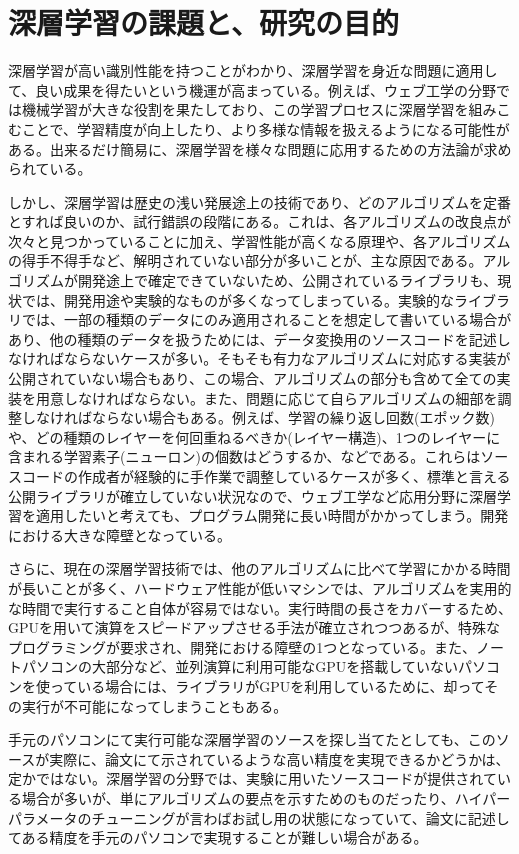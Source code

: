 \section{深層学習の課題と、研究の目的}
深層学習が高い識別性能を持つことがわかり、深層学習を身近な問題に適用して、良い成果を得たいという機運が高まっている。例えば、ウェブ工学の分野では機械学習が大きな役割を果たしており、この学習プロセスに深層学習を組みこむことで、学習精度が向上したり、より多様な情報を扱えるようになる可能性がある。出来るだけ簡易に、深層学習を様々な問題に応用するための方法論が求められている。\par
しかし、深層学習は歴史の浅い発展途上の技術であり、どのアルゴリズムを定番とすれば良いのか、試行錯誤の段階にある。これは、各アルゴリズムの改良点が次々と見つかっていることに加え、学習性能が高くなる原理や、各アルゴリズムの得手不得手など、解明されていない部分が多いことが、主な原因である。アルゴリズムが開発途上で確定できていないため、公開されているライブラリも、現状では、開発用途や実験的なものが多くなってしまっている。実験的なライブラリでは、一部の種類のデータにのみ適用されることを想定して書いている場合があり、他の種類のデータを扱うためには、データ変換用のソースコードを記述しなければならないケースが多い。そもそも有力なアルゴリズムに対応する実装が公開されていない場合もあり、この場合、アルゴリズムの部分も含めて全ての実装を用意しなければならない。また、問題に応じて自らアルゴリズムの細部を調整しなければならない場合もある。例えば、学習の繰り返し回数(エポック数)や、どの種類のレイヤーを何回重ねるべきか(レイヤー構造)、1つのレイヤーに含まれる学習素子(ニューロン)の個数はどうするか、などである。これらはソースコードの作成者が経験的に手作業で調整しているケースが多く、標準と言える公開ライブラリが確立していない状況なので、ウェブ工学など応用分野に深層学習を適用したいと考えても、プログラム開発に長い時間がかかってしまう。開発における大きな障壁となっている。\par
さらに、現在の深層学習技術では、他のアルゴリズムに比べて学習にかかる時間が長いことが多く、ハードウェア性能が低いマシンでは、アルゴリズムを実用的な時間で実行すること自体が容易ではない。実行時間の長さをカバーするため、GPUを用いて演算をスピードアップさせる手法が確立されつつあるが、特殊なプログラミングが要求され、開発における障壁の1つとなっている。また、ノートパソコンの大部分など、並列演算に利用可能なGPUを搭載していないパソコンを使っている場合には、ライブラリがGPUを利用しているために、却ってその実行が不可能になってしまうこともある。\par
手元のパソコンにて実行可能な深層学習のソースを探し当てたとしても、このソースが実際に、論文にて示されているような高い精度を実現できるかどうかは、定かではない。深層学習の分野では、実験に用いたソースコードが提供されている場合が多いが、単にアルゴリズムの要点を示すためのものだったり、ハイパーパラメータのチューニングが言わばお試し用の状態になっていて、論文に記述してある精度を手元のパソコンで実現することが難しい場合がある。\par
